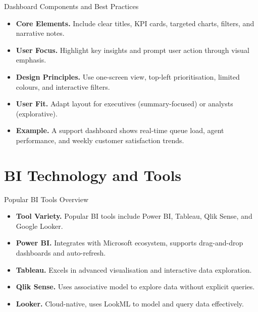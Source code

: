 \documentclass[aspectratio=169, table]{beamer}
\begin{document}
\begin{frame}{Dashboard Components and Best Practices}
	\vspace{20pt}
	\begin{itemize}
		\item \textbf{Core Elements.} Include clear titles, KPI cards, targeted charts, filters, and narrative notes.
		\item \textbf{User Focus.} Highlight key insights and prompt user action through visual emphasis.
		\item \textbf{Design Principles.} Use one-screen view, top-left prioritisation, limited colours, and interactive filters.
		\item \textbf{User Fit.} Adapt layout for executives (summary-focused) or analysts (explorative).
		\item \textbf{Example.} A support dashboard shows real-time queue load, agent performance, and weekly customer satisfaction trends.
	\end{itemize}
\end{frame}

\section{BI Technology and Tools}


\begin{frame}{Popular BI Tools Overview}
	\vspace{20pt}
	\begin{itemize}
		\item \textbf{Tool Variety.} Popular BI tools include Power BI, Tableau, Qlik Sense, and Google Looker.
		\item \textbf{Power BI.} Integrates with Microsoft ecosystem, supports drag-and-drop dashboards and auto-refresh.
		\item \textbf{Tableau.} Excels in advanced visualisation and interactive data exploration.
		\item \textbf{Qlik Sense.} Uses associative model to explore data without explicit queries.
		\item \textbf{Looker.} Cloud-native, uses LookML to model and query data effectively.
	\end{itemize}
\end{frame}
\end{document}
